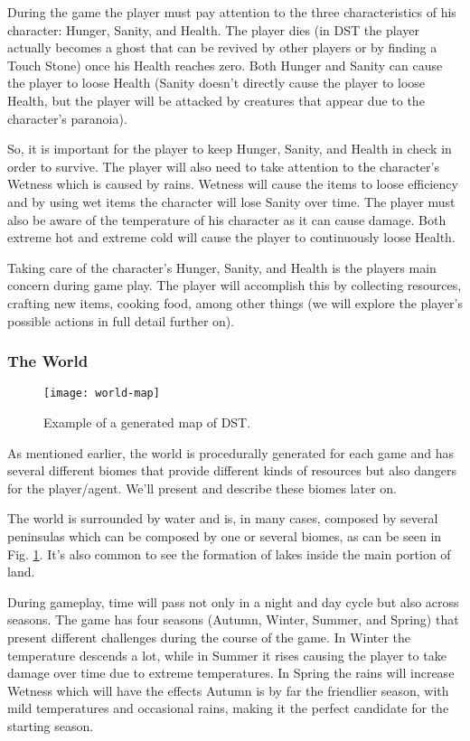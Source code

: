 During the game the player must pay attention to the three characteristics of his character: Hunger, Sanity, and Health.
The player dies (in \ac{DST} the player actually becomes a ghost that can be revived by other players or by finding a Touch Stone) once his Health reaches zero.
Both Hunger and Sanity can cause the player to loose Health (Sanity doesn't directly cause the player to loose Health, but the player will be attacked by creatures that appear due to the character's paranoia).

So, it is important for the player to keep Hunger, Sanity, and Health in check in order to survive.
The player will also need to take attention to the character's Wetness which is caused by rains.
Wetness will cause the items to loose efficiency and by using wet items the character will lose Sanity over time.
The player must also be aware of the temperature of his character as it can cause damage.
Both extreme hot and extreme cold will cause the player to continuously loose Health.

Taking care of the character's Hunger, Sanity, and Health is the players main concern during game play.
The player will accomplish this by collecting resources, crafting new items, cooking food, among other things (we will explore the player's possible actions in full detail further on).

\subsubsection{The World}

\begin{figure}
  \centering
    \texttt{[image: world-map]}
  \caption{Example of a generated map of \ac{DST}.}
  \label{fig:world-map}
\end{figure}
As mentioned earlier, the world is procedurally generated for each game and has several different biomes that provide different kinds of resources but also dangers for the player/agent. 
We'll present and describe these biomes later on.

The world is surrounded by water and is, in many cases, composed by several peninsulas which can be composed by one or several biomes, as can be seen in Fig. \ref{fig:world-map}.
It's also common to see the formation of lakes inside the main portion of land.

During gameplay, time will pass not only in a night and day cycle but also across seasons.
The game has four seasons (Autumn, Winter, Summer, and Spring) that present different challenges during the course of the game.
In Winter the temperature descends a lot, while in Summer it rises causing the player to take damage over time due to extreme temperatures.
In Spring the rains will increase Wetness which will have the effects 
Autumn is by far the friendlier season, with mild temperatures and occasional rains, making it the perfect candidate for the starting season.

